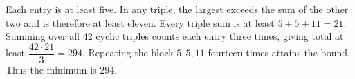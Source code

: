 Each entry is at least five. In any triple, the largest exceeds the sum of the other two and is therefore at least eleven. Every triple sum is at least $5+5+11=21$. Summing over all 42 cyclic triples counts each entry three times, giving total at least $\dfrac{42\cdot21}{3}=294$. Repeating the block $5,5,11$ fourteen times attains the bound. Thus the minimum is $\boxed{294}$.
